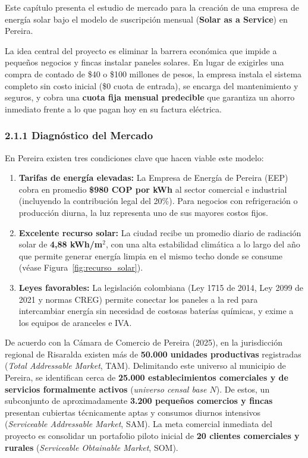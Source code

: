 \documentclass[12pt,letterpaper]{article}
\begin{document}
Este capítulo presenta el estudio de mercado para la creación de una empresa de energía solar bajo el modelo de suscripción mensual (\textbf{Solar as a Service}) en Pereira. 

La idea central del proyecto es eliminar la barrera económica que impide a pequeños negocios y fincas instalar paneles solares. En lugar de exigirles una compra de contado de \$40 o \$100 millones de pesos, la empresa instala el sistema completo sin costo inicial (\$0 cuota de entrada), se encarga del mantenimiento y seguros, y cobra una \textbf{cuota fija mensual predecible} que garantiza un ahorro inmediato frente a lo que pagan hoy en su factura eléctrica.

\vspace{0.2cm}

\subsubsection{2.1.1 Diagnóstico del Mercado}

En Pereira existen tres condiciones clave que hacen viable este modelo:
\begin{enumerate}[leftmargin=1.5em, itemsep=2pt]
    \item \textbf{Tarifas de energía elevadas:} La Empresa de Energía de Pereira (EEP) cobra en promedio \textbf{\$980 COP por kWh} al sector comercial e industrial (incluyendo la contribución legal del 20\%). Para negocios con refrigeración o producción diurna, la luz representa uno de sus mayores costos fijos.
    \item \textbf{Excelente recurso solar:} La ciudad recibe un promedio diario de radiación solar de \textbf{4,88 kWh/m$^2$}, con una alta estabilidad climática a lo largo del año que permite generar energía limpia en el mismo techo donde se consume (véase Figura~\ref{fig:recurso_solar}).
    \item \textbf{Leyes favorables:} La legislación colombiana (Ley 1715 de 2014, Ley 2099 de 2021 y normas CREG) permite conectar los paneles a la red para intercambiar energía sin necesidad de costosas baterías químicas, y exime a los equipos de aranceles e IVA.
\end{enumerate}

De acuerdo con la Cámara de Comercio de Pereira (2025), en la jurisdicción regional de Risaralda existen más de \textbf{50.000 unidades productivas} registradas (\textit{Total Addressable Market}, TAM). Delimitando este universo al municipio de Pereira, se identifican cerca de \textbf{25.000 establecimientos comerciales y de servicios formalmente activos} (\textit{universo censal base $N$}). De estos, un subconjunto de aproximadamente \textbf{3.200 pequeños comercios y fincas} presentan cubiertas técnicamente aptas y consumos diurnos intensivos (\textit{Serviceable Addressable Market}, SAM). La meta comercial inmediata del proyecto es consolidar un portafolio piloto inicial de \textbf{20 clientes comerciales y rurales} (\textit{Serviceable Obtainable Market}, SOM).
\end{document}
